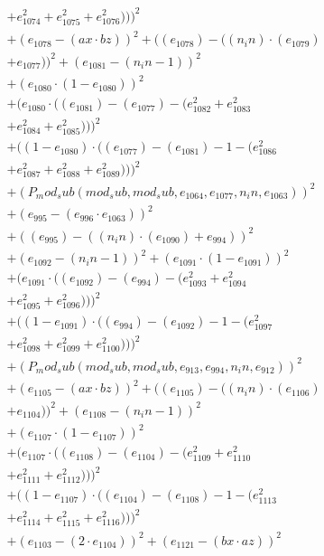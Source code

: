 \documentclass[10pt, a4paper]{article}
\begin{document}
\begin{small}
\begin{align*}
& + e_{1074}^{2} + e_{1075}^{2} + e_{1076}^{2})))^{2} \\
& + (e_{1078} - (ax  \cdot  bz))^{2} + ((e_{1078}) - ((n_in)  \cdot  (e_{1079}) \\
& + e_{1077}))^{2} + (e_{1081} - (n_in - 1))^{2} \\
& + (e_{1080}  \cdot  (1 - e_{1080}))^{2} \\
& + (e_{1080}  \cdot  ((e_{1081}) - (e_{1077}) - (e_{1082}^{2} + e_{1083}^{2} \\
& + e_{1084}^{2} + e_{1085}^{2})))^{2} \\
& + ((1 - e_{1080})  \cdot  ((e_{1077}) - (e_{1081}) - 1 - (e_{1086}^{2} \\
& + e_{1087}^{2} + e_{1088}^{2} + e_{1089}^{2})))^{2} \\
& + (P_mod_sub(mod_sub, mod_sub, e_{1064}, e_{1077}, n_in, e_{1063}))^{2} \\
& + (e_{995} - (e_{996}  \cdot  e_{1063}))^{2} \\
& + ((e_{995}) - ((n_in)  \cdot  (e_{1090}) + e_{994}))^{2} \\
& + (e_{1092} - (n_in - 1))^{2} + (e_{1091}  \cdot  (1 - e_{1091}))^{2} \\
& + (e_{1091}  \cdot  ((e_{1092}) - (e_{994}) - (e_{1093}^{2} + e_{1094}^{2} \\
& + e_{1095}^{2} + e_{1096}^{2})))^{2} \\
& + ((1 - e_{1091})  \cdot  ((e_{994}) - (e_{1092}) - 1 - (e_{1097}^{2} \\
& + e_{1098}^{2} + e_{1099}^{2} + e_{1100}^{2})))^{2} \\
& + (P_mod_sub(mod_sub, mod_sub, e_{913}, e_{994}, n_in, e_{912}))^{2} \\
& + (e_{1105} - (ax  \cdot  bz))^{2} + ((e_{1105}) - ((n_in)  \cdot  (e_{1106}) \\
& + e_{1104}))^{2} + (e_{1108} - (n_in - 1))^{2} \\
& + (e_{1107}  \cdot  (1 - e_{1107}))^{2} \\
& + (e_{1107}  \cdot  ((e_{1108}) - (e_{1104}) - (e_{1109}^{2} + e_{1110}^{2} \\
& + e_{1111}^{2} + e_{1112}^{2})))^{2} \\
& + ((1 - e_{1107})  \cdot  ((e_{1104}) - (e_{1108}) - 1 - (e_{1113}^{2} \\
& + e_{1114}^{2} + e_{1115}^{2} + e_{1116}^{2})))^{2} \\
& + (e_{1103} - (2  \cdot  e_{1104}))^{2} + (e_{1121} - (bx  \cdot  az))^{2} \\

\end{align*}
\end{small}
\end{document}
